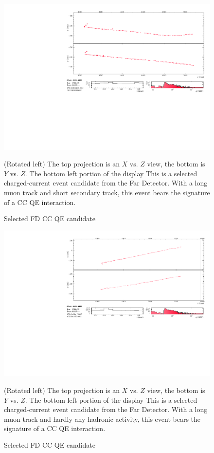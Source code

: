 \begin{figure}
\begin{center}
\vspace{-35pt}

\includegraphics[width=0.87\textheight, angle=90]{figures/results/evd/evd_xzyx-proj_17953_256887.pdf}
\end{center}
\caption{Selected FD \numu CC QE candidate}{
(Rotated left) The top projection is an $X$ vs. $Z$
view, the bottom is $Y$ vs. $Z$.
The bottom left portion of the display
This is a selected \numu charged-current event candidate from the
Far Detector.
With a long muon track and short secondary track, this event bears
the signature of a CC QE interaction.}
\label{evd_qe_1}
\end{figure}
\begin{figure}
\begin{center}
\vspace{-35pt}

\includegraphics[width=0.87\textheight, angle=90]{figures/results/evd/evd_xzyx-proj_19054_383867.pdf}
\end{center}
\caption{Selected FD \numu CC QE candidate}{
(Rotated left) The top projection is an $X$ vs. $Z$
view, the bottom is $Y$ vs. $Z$.
The bottom left portion of the display
This is a selected \numu charged-current event candidate from the
Far Detector.
With a long muon track and hardly any hadronic activity, this event bears
the signature of a CC QE interaction.}
\label{evd_qe_2}
\end{figure}
